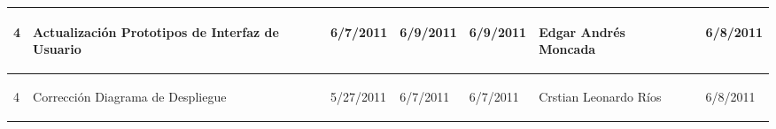 \begin{center}
\begin{longtable}{|p{}|p{}|p{}|p{}|p{}|p{}|p{}|p{}|}
{\begin{center} 4  \end{center}} & 
{\begin{center} Actualización Prototipos de Interfaz de Usuario \end{center}} & 
{\begin{center} 6/7/2011 \end{center}} & 
{\begin{center} 6/9/2011  \end{center}} & 
{\begin{center} 6/9/2011 \end{center}} & 
{\begin{center} Edgar Andrés Moncada \end{center}} & 
{\begin{center}  \end{center}} & 
{\begin{center} 6/8/2011  \end{center}}\\
\hline

{\begin{center} 4 \end{center}} & 
{\begin{center} Corrección Diagrama de Despliegue \end{center}} & 
{\begin{center} 5/27/2011 \end{center}} & 
{\begin{center} 6/7/2011 \end{center}} & 
{\begin{center} 6/7/2011 \end{center}} & 
{\begin{center} Crstian Leonardo Ríos \end{center}} & 
{\begin{center}  \end{center}} & 
{\begin{center} 6/8/2011 \end{center}}\\
\hline


\end{longtable}
\end{center}
